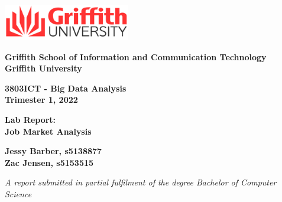 \documentclass[twoside, 12pt, a4paper]{article}
\newenvironment{myindentpar}[1]%
{\begin{list}{}%
		{\setlength{\leftmargin}{#1}}%
		\item[]%
	}
	{\end{list}}
\begin{document}
\begin{titlepage}
\begin{flushright}
	\includegraphics[height=60px]{griffithlogo.png}
\end{flushright}
\begin{large}
\textbf{Griffith School of Information and Communication Technology}\\
\textbf{Griffith University}

\vspace*{8mm}

\textbf{3803ICT - Big Data Analysis}\\
\textbf{Trimester 1, 2022}
\end{large}

\vspace*{15mm}

\begin{Huge}
\begin{center}
\textbf{Lab Report:}\\
\textbf{Job Market Analysis}
\end{center}
\end{Huge}

\vspace*{5mm}
\begin{large}


\vspace*{8mm}

\textbf{Jessy Barber, s5138877}\\
\hspace*{4.5mm}
\textbf{Zac Jensen, s5153515}\\
\newline

\vspace*{8mm}
\begin{myindentpar}{2cm}
\emph{A report submitted in partial fulfilment of the degree Bachelor of Computer Science}
\end{myindentpar}



\end{large}


\vfill

\end{titlepage}
\end{document}
